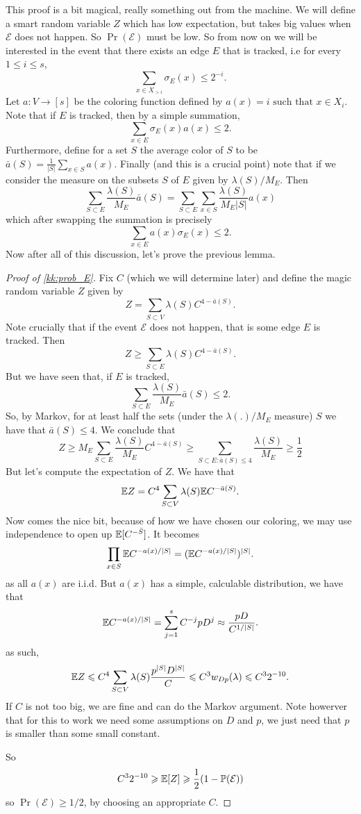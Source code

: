     
This proof is a bit magical, really something out from the machine.
We will define a smart random variable $Z$ which has low expectation,
but takes big values when $\mathcal{E}$ does not happen. 
So $\Pr(\mathcal{E})$ must be low. So from now on we will be interested 
in the event that there exists an edge $E$ that is tracked, i.e for every 
$1 \leq i \leq s$,
\[
    \sum_{x \in X_{>i}} \sigma_E(x) \leq 2^{-i}.
\]
Let $a : V \to [s]$ be the coloring function defined by
$a(x) = i \text{ such that } x \in X_i$. Note that if $E$ is tracked, 
then by a simple summation,
\[
    \sum_{x \in E} \sigma_E(x)a(x) \leq 2.
\]
Furthermore, define for a set $S$ the average color of $S$ to be 
$\bar{a}(S) = \frac{1}{|S|} \sum_{x \in S} a(x)$. Finally (and this is a crucial point)
note that if we consider the measure on the subsets $S$ of $E$ given by 
$\lambda(S)/M_E$. Then 
\[
    \sum_{S \subset E} \frac{\lambda(S)}{M_E} \bar{a}(S) 
    = \sum_{S \subset E} \sum_{x \in S} \frac{\lambda(S)}{M_E|S|} a(x)
\]
which after swapping the summation is precisely 
\[
    \sum_{x \in E} a(x) \sigma_E(x) \leq 2.
\]
Now after all of this discussion, let's prove the previous lemma.
\begin{proof}[Proof of \ref{kk:prob_E}]
    Fix $C$ (which we will determine later) and define the magic random
    variable $Z$ given by 
    \[
        Z = \sum_{S \subset V} \lambda(S) C^{4 - \bar{a}(S)}.
    \]
    Note crucially that if the event $\mathcal{E}$ does not happen, that is 
    some edge $E$ is tracked. Then 
    \[
        Z \geq \sum_{S \subset E} \lambda(S) C^{4 - \bar{a}(S)}.
    \]
    But we have seen that, if $E$ is tracked, 
    \[
    \sum_{S \subset E} \frac{\lambda(S)}{M_E} \bar{a}(S) \leq 2. 
    \]
    So, by Markov, for at least half the sets (under the $\lambda(.)/M_E$ measure) $S$
    we have that $\bar{a}(S) \leq 4$. We conclude that 
    \[
        Z \geq M_E \sum_{S \subset E} \frac{\lambda(S)}{M_E} C^{4 - \bar{a}(S)}
        \geq \sum_{S \subset E: \bar{a}(S) \leq 4} \frac{\lambda(S)}{M_E} \geq \frac{1}{2}
    \]
    But let's compute the expectation of $Z$. We have that 
    \[
        \mathbb{E} Z = C^4\sum_{S \subset V} \lambda(S) \mathbb{E} C^{-\bar{a}(S)}.
    \]
    Now comes the nice bit, because of how we have chosen our coloring, 
    we may use independence to open up $\mathbb{E}[C^{-\bar{S}}]$. It becomes
    \[
        \prod_{x \in S}\mathbb{E} C^{-a(x)/|S|} = (\mathbb{E} C^{-a(x)/|S|})^{|S|}.
    \]
    as all $a(x)$ are i.i.d.  But $a(x)$ has a simple, calculable distribution, 
    we have that 
    \[
        \mathbb{E} C^{-a(x)/|S|} = \sum_{j = 1}^s C^{-j} p D^{j} \approx \frac{pD}{C^{1/|S|}}.
    \]
    as such, 
    \[
        \mathbb{E} Z \leqslant C^4 \sum_{S \subset V} \lambda(S) \frac{p^{|S|}D^{|S|}}{C} \leqslant C^3 w_{Dp}(\lambda) \leqslant C^3 2^{-10}.
    \]
    If $C$ is not too big, we are fine and can do the Markov argument. Note howerver 
    that for this to work we need some assumptions on $D$ and $p$, we just need that $p$ is smaller 
    than some small constant.

    So
    \[
        C^32^{-10} \geqslant \mathbb{E}[Z] \geqslant \frac{1}{2} (1-\mathbb{P}(\mathcal{E}))
    \]
    so $\Pr(\mathcal{E}) \geq 1/2$, by choosing an appropriate $C$.
\end{proof}

